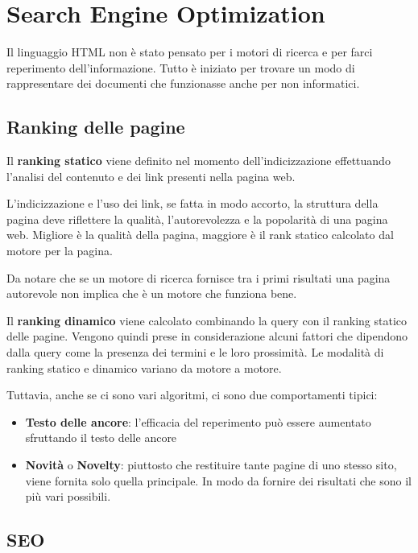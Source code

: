 
\section{Search Engine Optimization}

Il linguaggio HTML non è stato pensato per i motori di ricerca e per farci reperimento dell'informazione. Tutto è iniziato per trovare un modo di rappresentare dei documenti che funzionasse anche per non informatici.

\subsection{Ranking delle pagine}

Il \textbf{ranking statico} viene definito nel momento dell'indicizzazione effettuando l'analisi del contenuto e dei link presenti nella pagina web.

L'indicizzazione e l'uso dei link, se fatta in modo accorto, la struttura della pagina deve riflettere la qualità, l'autorevolezza e la popolarità di una pagina web. 
Migliore è la qualità della pagina, maggiore è il rank statico calcolato dal motore per la pagina.

Da notare che se un motore di ricerca fornisce tra i primi risultati una pagina autorevole non implica che è un motore che funziona bene.

Il \textbf{ranking dinamico} viene calcolato combinando la query con il ranking statico delle pagine. Vengono quindi prese in considerazione alcuni fattori che dipendono dalla query come la presenza dei termini e le loro prossimità.
Le modalità di ranking statico e dinamico variano da motore a motore.

Tuttavia, anche se ci sono vari algoritmi, ci sono due comportamenti tipici:

\begin{itemize}
	\item \textbf{Testo delle ancore}: l’efficacia del reperimento può essere aumentato sfruttando il testo delle ancore
	\item \textbf{Novità} o \textbf{Novelty}: piuttosto che restituire tante pagine di uno stesso sito, viene fornita solo quella principale. In modo da fornire dei risultati che sono il più vari possibili.
\end{itemize}

\subsection{SEO}

